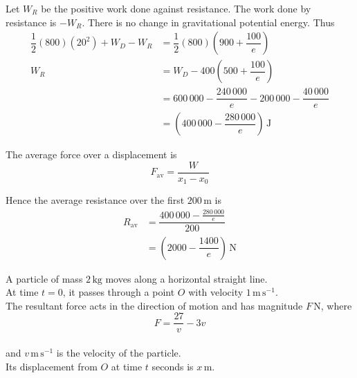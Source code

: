\documentclass[leqno]{article}
\begin{document}
\begin{enumerate}[
  label=\textbf{\arabic*.},
  leftmargin=*,
  topsep=0pt,
  partopsep=0pt,
  parsep=0pt
]
\begin{djsSolution}
\begin{enumerate}[label=\textbf{(\alph*)}, start=1]
  Let \(W_R\) be the positive work done against resistance. The work done by resistance is \(-W_R\). There is no change in gravitational potential energy. Thus
  \begin{align*}
  \dfrac12(800)(20^2)+W_D-W_R
  &=\dfrac12(800)\left(900+\dfrac{100}{e}\right)\\
  W_R&=W_D-400\left(500+\dfrac{100}{e}\right)\\
  &=600\,000-\dfrac{240\,000}{e}-200\,000-\dfrac{40\,000}{e}\\
  &=\left(400\,000-\dfrac{280\,000}{e}\right)\,\mathrm{J}
  \end{align*}

  The average force over a displacement is
  \[
  F_{\mathrm{av}}=\dfrac{W}{x_1-x_0}
  \]

  Hence the average resistance over the first \(200\,\mathrm{m}\) is
  \begin{align*}
  R_{\mathrm{av}}&=\dfrac{400\,000-\frac{280\,000}{e}}{200}\\
  &=\left(2000-\dfrac{1400}{e}\right)\,\mathrm{N}
  \end{align*}

\end{enumerate}
\end{djsSolution}

\newpage

\questionitem

A particle of mass $2\,\mathrm{kg}$ moves along a horizontal straight line. \\
At time $t=0$, it passes through a point $O$ with velocity $1\,\mathrm{m\,s^{-1}}$. \\
The resultant force acts in the direction of motion and has magnitude $F\,\mathrm{N}$, where
\[
F=\frac{27}{v}-3v
\] \\
and $v\,\mathrm{m\,s^{-1}}$ is the velocity of the particle. \\
Its displacement from $O$ at time $t$ seconds is $x\,\mathrm{m}$. \\


\end{enumerate}
\end{document}
